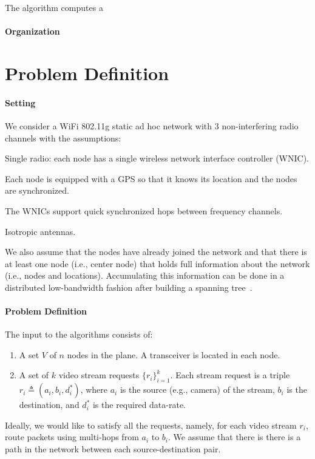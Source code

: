 \documentclass[12pt]{article}
\newenvironment{proof sketch}[1]{\noindent {\emph{Proof sketch of #1:}}}{\hfill \qed}
\newcommand{\eqdf}{\triangleq}
\begin{document}
 The algorithm computes a
\paragraph{Organization}

\section{Problem Definition}\label{sec:problem}
\paragraph{Setting}
We consider a WiFi 802.11g static ad hoc network with $3$ non-interfering radio
channels with the assumptions:
\begin{inparaenum}[(i)]
\item Single radio: each node has a single wireless network interface
  controller (WNIC).
\item Each node is equipped with a GPS so that it knows
  its location and the nodes are synchronized.
\item The WNICs support quick synchronized hops between frequency
  channels.
\item Isotropic antennas.
\item We also assume that the nodes have already joined the network
  and that there is at least one node (i.e., center node) that holds
  full information about the network (i.e., nodes and locations).
  Accumulating this information can be done in a distributed
  low-bandwidth fashion after building a spanning
  tree~\cite{awerbuch1987optimal}.
\end{inparaenum}




\paragraph{Problem Definition}
The input to the algorithms consists of:
\begin{enumerate}
\item A set $V$ of $n$ nodes in the plane. A transceiver is located in
  each node.
\item A set of $k$ video stream requests $\{r_i\}_{i=1}^k$. Each
  stream request is a triple $r_i\eqdf (a_i,b_i,d^*_i)$, where $a_i$ is
  the source (e.g., camera) of the stream, $b_i$ is the destination,
  and $d^*_i$ is the required data-rate.
\end{enumerate}
Ideally, we would like to satisfy all the requests, namely, for each
video stream $r_i$, route packets using multi-hops from $a_i$ to $b_i$.
We assume that there is there is a path in the network between each
source-destination pair.
\end{document}
